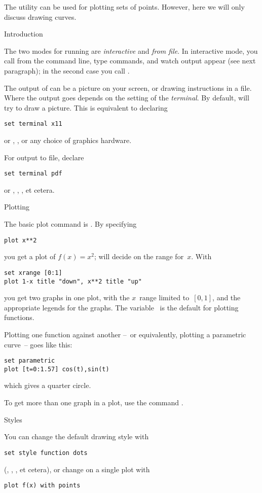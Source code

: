 The  utility can be used for plotting sets of
points. However, here we will only discuss drawing curves.

 {Introduction}

The two modes for running  are \emph{interactive} and
\emph{from file}. In interactive mode, you call  from the
command line, type commands, and watch output appear (see next
paragraph); in the second case you call .

The output of  can be a picture on your screen, or drawing
instructions in a file. Where the output goes depends on the setting
of the \emph{terminal}. By default,  will try to draw a
picture. This is equivalent to declaring
\begin{verbatim}
set terminal x11
\end{verbatim}
or , , or any choice of graphics hardware.

For output to file, declare
\begin{verbatim}
set terminal pdf
\end{verbatim}
or , , , et cetera.

 {Plotting}

The basic plot command is . By specifying
\begin{verbatim}
plot x**2
\end{verbatim}
you get a plot of $f(x)=x^2$;  will decide on the range
for~$x$.
With
\begin{verbatim}
set xrange [0:1]
plot 1-x title "down", x**2 title "up"
\end{verbatim}
you get two graphs in one plot, with the $x$~range limited to~$[0,1]$,
and the appropriate legends for the graphs. The variable~ is the
default for plotting functions.

Plotting one function against another --~or equivalently, plotting a
parametric curve~-- goes like this:
\begin{verbatim}
set parametric
plot [t=0:1.57] cos(t),sin(t)
\end{verbatim}
which gives a quarter circle.

To get more than one graph in a plot, use the command .

 {Styles}

You can change the default drawing style with
\begin{verbatim}
set style function dots
\end{verbatim}
(, , , et cetera), or
change on a single plot with
\begin{verbatim}
plot f(x) with points
\end{verbatim}
